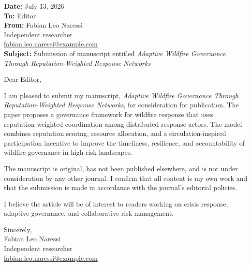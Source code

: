 \documentclass[11pt]{article}
\begin{document}
\noindent\textbf{Date:} July 13, 2026\\[0.5em]
\textbf{To:} Editor\\[0.2em]
\textbf{From:} Fabian Leo Naressi\\
Independent researcher\\
\href{mailto:fabian.leo.naressi@example.com}{fabian.leo.naressi@example.com}\\[1em]

\textbf{Subject:} Submission of manuscript entitled \emph{Adaptive Wildfire Governance Through Reputation-Weighted Response Networks}

\vspace{1em}

Dear Editor,

I am pleased to submit my manuscript, \emph{Adaptive Wildfire Governance Through Reputation-Weighted Response Networks}, for consideration for publication. The paper proposes a governance framework for wildfire response that uses reputation-weighted coordination among distributed response actors. The model combines reputation scoring, resource allocation, and a circulation-inspired participation incentive to improve the timeliness, resilience, and accountability of wildfire governance in high-risk landscapes.

The manuscript is original, has not been published elsewhere, and is not under consideration by any other journal. I confirm that all content is my own work and that the submission is made in accordance with the journal's editorial policies.

I believe the article will be of interest to readers working on crisis response, adaptive governance, and collaborative risk management.

\vspace{1em}

Sincerely,\\[1em]
Fabian Leo Naressi\\
Independent researcher\\
\href{mailto:fabian.leo.naressi@example.com}{fabian.leo.naressi@example.com}
\end{document}
